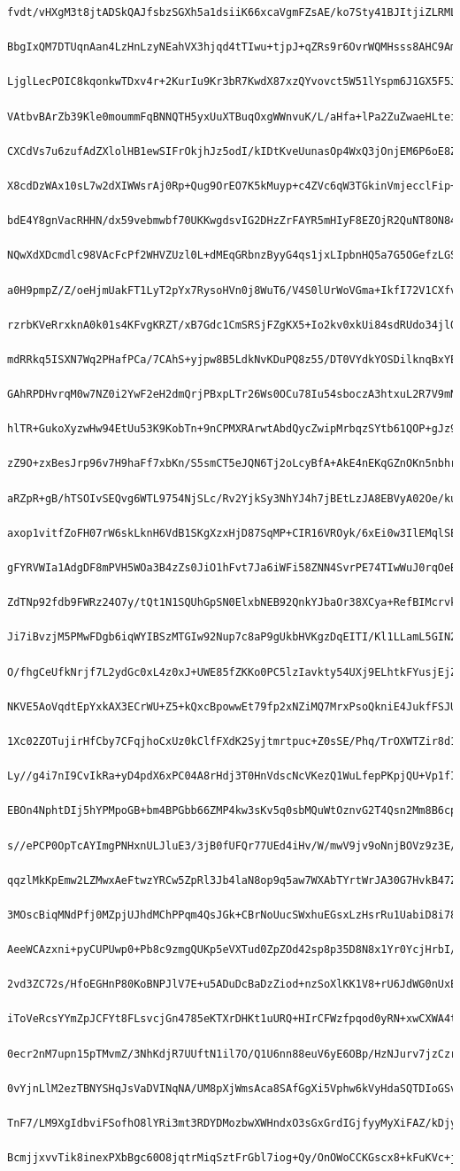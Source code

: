\documentclass[
    article,            %
    11pt,               %
    oneside,            %
    a4paper,            %
    english,            %
    brazil,             %
    sumario=tradicional,
    ]{abntex2}
\begin{document}
\begin{Verbatim}[frame=single, commandchars=\\\{\}, fontsize=\footnotesize]
    fvdt/vHXgM3t8jtADSkQAJfsbzSGXh5a1dsiiK66xcaVgmFZsAE/ko7Sty41BJItjiZLRMLz
    BbgIxQM7DTUqnAan4LzHnLzyNEahVX3hjqd4tTIwu+tjpJ+qZRs9r6OvrWQMHsss8AHC9AmY
    LjglLecPOIC8kqonkwTDxv4r+2KurIu9Kr3bR7KwdX87xzQYvovct5W51lYspm6J1GX5F5J9
    VAtbvBArZb39Kle0moummFqBNNQTH5yxUuXTBuqOxgWWnvuK/L/aHfa+lPa2ZuZwaeHLteiT
    CXCdVs7u6zufAdZXlolHB1ewSIFrOkjhJz5odI/kIDtKveUunasOp4WxQ3jOnjEM6P6oE8ZW
    X8cdDzWAx10sL7w2dXIWWsrAj0Rp+Qug9OrEO7K5kMuyp+c4ZVc6qW3TGkinVmjecclFip+2
    bdE4Y8gnVacRHHN/dx59vebmwbf70UKKwgdsvIG2DHzZrFAYR5mHIyF8EZOjR2QuNT8ON84z
    NQwXdXDcmdlc98VAcFcPf2WHVZUzl0L+dMEqGRbnzByyG4qs1jxLIpbnHQ5a7G5OGefzLGSV
    a0H9pmpZ/Z/oeHjmUakFT1LyT2pYx7RysoHVn0j8WuT6/V4S0lUrWoVGma+IkfI72V1CXfvg
    rzrbKVeRrxknA0k01s4KFvgKRZT/xB7Gdc1CmSRSjFZgKX5+Io2kv0xkUi84sdRUdo34jlOx
    mdRRkq5ISXN7Wq2PHafPCa/7CAhS+yjpw8B5LdkNvKDuPQ8z55/DT0VYdkYOSDilknqBxYEU
    GAhRPDHvrqM0w7NZ0i2YwF2eH2dmQrjPBxpLTr26Ws0OCu78Iu54sboczA3htxuL2R7V9mNY
    hlTR+GukoXyzwHw94EtUu53K9KobTn+9nCPMXRArwtAbdQycZwipMrbqzSYtb61QOP+gJz9W
    zZ9O+zxBesJrp96v7H9haFf7xbKn/S5smCT5eJQN6Tj2oLcyBfA+AkE4nEKqGZnOKn5nbhrb
    aRZpR+gB/hTSOIvSEQvg6WTL9754NjSLc/Rv2YjkSy3NhYJ4h7jBEtLzJA8EBVyA02Oe/kup
    axop1vitfZoFH07rW6skLknH6VdB1SKgXzxHjD87SqMP+CIR16VROyk/6xEi0w3IlEMqlSEz
    gFYRVWIa1AdgDF8mPVH5WOa3B4zZs0JiO1hFvt7Ja6iWFi58ZNN4SvrPE74TIwWuJ0rqOeBo
    ZdTNp92fdb9FWRz24O7y/tQt1N1SQUhGpSN0ElxbNEB92QnkYJbaOr38XCya+RefBIMcrvkC
    Ji7iBvzjM5PMwFDgb6iqWYIBSzMTGIw92Nup7c8aP9gUkbHVKgzDqEITI/Kl1LLamL5GIN20
    O/fhgCeUfkNrjf7L2ydGc0xL4z0xJ+UWE85fZKKo0PC5lzIavkty54UXj9ELhtkFYusjEjZy
    NKVE5AoVqdtEpYxkAX3ECrWU+Z5+kQxcBpowwEt79fp2xNZiMQ7MrxPsoQkniE4JukfFSJU5
    1Xc02ZOTujirHfCby7CFqjhoCxUz0kClfFXdK2Syjtmrtpuc+Z0sSE/Phq/TrOXWTZir8d1R
    Ly//g4i7nI9CvIkRa+yD4pdX6xPC04A8rHdj3T0HnVdscNcVKezQ1WuLfepPKpjQU+Vp1fI1
    EBOn4NphtDIj5hYPMpoGB+bm4BPGbb66ZMP4kw3sKv5q0sbMQuWtOznvG2T4Qsn2Mm8B6cpE
    s//ePCP0OpTcAYImgPNHxnULJluE3/3jB0fUFQr77UEd4iHv/W/mwV9jv9oNnjBOVz9z3E/F
    qqzlMkKpEmw2LZMwxAeFtwzYRCw5ZpRl3Jb4laN8op9q5aw7WXAbTYrtWrJA30G7HvkB47Z8
    3MOscBiqMNdPfj0MZpjUJhdMChPPqm4QsJGk+CBrNoUucSWxhuEGsxLzHsrRu1UabiD8i78f
    AeeWCAzxni+pyCUPUwp0+Pb8c9zmgQUKp5eVXTud0ZpZOd42sp8p35D8N8x1Yr0YcjHrbI/X
    2vd3ZC72s/HfoEGHnP80KoBNPJlV7E+u5ADuDcBaDzZiod+nzSoXlKK1V8+rU6JdWG0nUxEw
    iToVeRcsYYmZpJCFYt8FLsvcjGn4785eKTXrDHKt1uURQ+HIrCFWzfpqod0yRN+xwCXWA4tp
    0ecr2nM7upn15pTMvmZ/3NhKdjR7UUftN1il7O/Q1U6nn88euV6yE6OBp/HzNJurv7jzCzrD
    0vYjnLlM2ezTBNYSHqJsVaDVINqNA/UM8pXjWmsAca8SAfGgXi5Vphw6kVyHdaSQTDIoGSvt
    TnF7/LM9XgIdbviFSofhO8lYRi3mt3RDYDMozbwXWHndxO3sGxGrdIGjfyyMyXiFAZ/kDjy8
    BcmjjxvvTik8inexPXbBgc60O8jqtrMiqSztFrGbl7iog+Qy/OnOWoCCKGscx8+kFuKVc+jD

\end{Verbatim}
\end{document}
